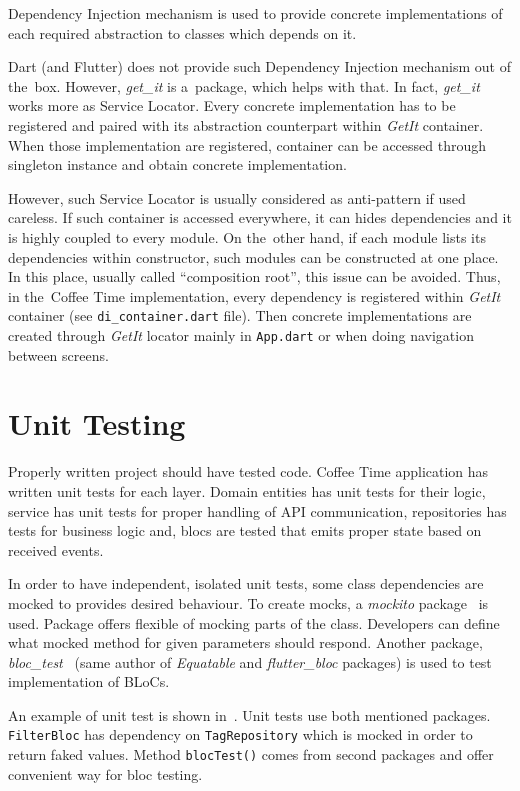 Dependency Injection mechanism is used to provide concrete implementations of each required abstraction to classes which depends on it. 

Dart (and Flutter) does not provide such Dependency Injection mechanism out of the~box. However, \textit{get\_it} is a~package, which helps with that. In fact, \textit{get\_it} works more as Service Locator. Every concrete implementation has to be registered and paired with its abstraction counterpart within \textit{GetIt} container. When those implementation are registered, container can be accessed through singleton instance and obtain concrete implementation.

However, such Service Locator is usually considered as anti-pattern if used careless. If such container is accessed everywhere, it can hides dependencies and it is highly coupled to every module. On the~other hand, if each module lists its dependencies within constructor, such modules can be constructed at one place. In this place, usually called ``composition root'', this issue can be avoided. Thus, in the~Coffee Time implementation, every dependency is registered within \textit{GetIt} container (see \verb|di_container.dart| file). Then concrete implementations are created through \textit{GetIt} locator mainly in \verb|App.dart| or when doing navigation between screens. 

\section{Unit Testing}
Properly written project should have tested code. Coffee Time application has written unit tests for each layer. Domain entities has unit tests for their logic, service has unit tests for proper handling of API communication, repositories has tests for business logic and, \gls{bloc}s are tested that emits proper state based on received events. 

In order to have independent, isolated unit tests, some class dependencies are mocked to provides desired behaviour. To create mocks, a \textit{mockito} package~\cite{package-mockito} is used. Package offers flexible of mocking parts of the class. Developers can define what mocked method for given parameters should respond. Another package, \textit{bloc\_test}~\cite{package-bloctest} (same author of \textit{Equatable} and \textit{flutter\_bloc} packages) is used to test implementation of BLoCs. 

An example of unit test is shown in~. Unit tests use both mentioned packages. \verb|FilterBloc| has dependency on \verb|TagRepository| which is mocked in order to return faked values. Method \verb|blocTest()| comes from second packages and offer convenient way for \gls{bloc} testing. 

